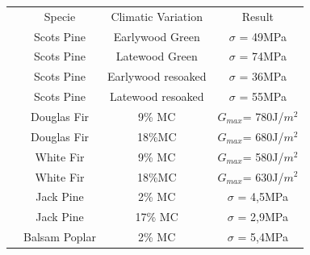 \begin{table}[h]
	\centering
	\begin{tabular}{cccc}
		\hline
		\rowcolor[HTML]{BFBFBF} 
		\multicolumn{1}{c}{\cellcolor[HTML]{BFBFBF}Reference} & \multicolumn{1}{c}{\cellcolor[HTML]{BFBFBF}Specie} & \multicolumn{1}{c}{\cellcolor[HTML]{BFBFBF}Climatic Variation} & \multicolumn{1}{c}{\cellcolor[HTML]{BFBFBF}Result} \\
		\multicolumn{1}{c}{\cellcolor[HTML]{FFE699}\cite{Kif1998}} & \multicolumn{1}{c}{Scots Pine} & \multicolumn{1}{c}{Earlywood Green} & \multicolumn{1}{c}{$\sigma$ = 49MPa} \\
		\multicolumn{1}{c}{\cellcolor[HTML]{FFE699}\cite{Kif1998}} & \multicolumn{1}{c}{Scots Pine} & \multicolumn{1}{c}{Latewood Green} & \multicolumn{1}{c}{$\sigma$ = 74MPa} \\
		\multicolumn{1}{c}{\cellcolor[HTML]{FFE699}\cite{Kif1998}} & \multicolumn{1}{c}{Scots Pine} & \multicolumn{1}{c}{Earlywood resoaked} & \multicolumn{1}{c}{$\sigma$ = 36MPa} \\
		\multicolumn{1}{c}{\cellcolor[HTML]{FFE699}\cite{Kif1998}} & \multicolumn{1}{c}{Scots Pine} & \multicolumn{1}{c}{Latewood resoaked} & \multicolumn{1}{c}{$\sigma$ = 55MPa} \\
		\multicolumn{1}{c}{\cellcolor[HTML]{B4C6E7}\parencite{Ang2017}} & \multicolumn{1}{c}{Douglas Fir} & \multicolumn{1}{c}{9\% MC} & \multicolumn{1}{c}{$G_{max}$= 780J/$m^{2}$} \\
		\multicolumn{1}{c}{\cellcolor[HTML]{B4C6E7}\cite{Ang2017}} & \multicolumn{1}{c}{Douglas Fir} & \multicolumn{1}{c}{18\%MC} & \multicolumn{1}{c}{$G_{max}$= 680J/$m^{2}$} \\
		\multicolumn{1}{c}{\cellcolor[HTML]{B4C6E7}\cite{Ang2017}} & \multicolumn{1}{c}{White Fir} & \multicolumn{1}{c}{9\% MC} & \multicolumn{1}{c}{$G_{max}$= 580J/$m^{2}$} \\
		\multicolumn{1}{c}{\cellcolor[HTML]{B4C6E7}\cite{Ang2017}} & \multicolumn{1}{c}{White Fir} & \multicolumn{1}{c}{18\%MC} & \multicolumn{1}{c}{$G_{max}$= 630J/$m^{2}$} \\
		\multicolumn{1}{c}{\cellcolor[HTML]{C6E0B4}\cite{Huang2020}} & \multicolumn{1}{c}{Jack Pine} & \multicolumn{1}{c}{2\% MC} & \multicolumn{1}{c}{$\sigma$ = 4,5MPa} \\
		\multicolumn{1}{c}{\cellcolor[HTML]{C6E0B4}\cite{Huang2020}} & \multicolumn{1}{c}{Jack Pine} & \multicolumn{1}{c}{17\% MC} & \multicolumn{1}{c}{$\sigma$ = 2,9MPa} \\
		\multicolumn{1}{c}{\cellcolor[HTML]{C6E0B4}\cite{Huang2020}} & \multicolumn{1}{c}{Balsam Poplar} & \multicolumn{1}{c}{2\% MC} & \multicolumn{1}{c}{$\sigma$ = 5,4MPa} \\

\end{tabular}
\end{table}
